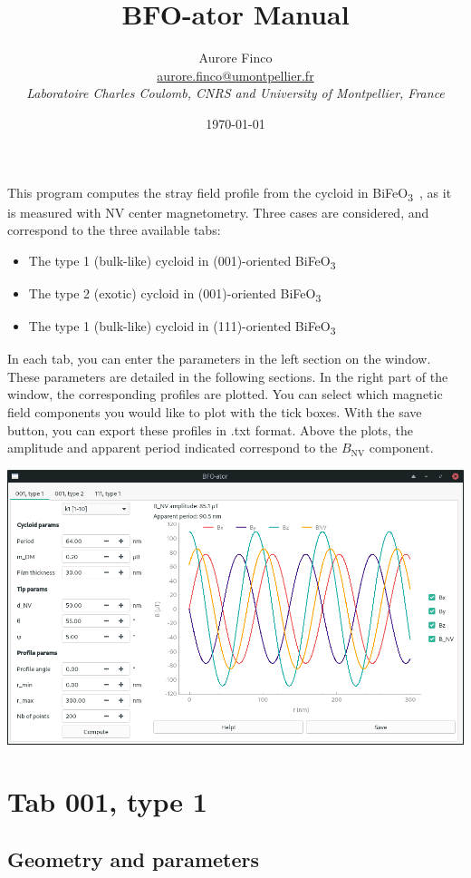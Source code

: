 \documentclass[a4paper,12pt]{article}
\title{BFO-ator Manual}
\author{Aurore Finco\\ \href{mailto:aurore.finco@umontpellier.fr}{aurore.finco@umontpellier.fr}\\ \textit{Laboratoire Charles Coulomb, CNRS and University of Montpellier, France}}
\date{\today}
\newcommand{\BFO}{BiFeO\textsubscript{3}\ }
\begin{document}
\maketitle

This program computes the stray field profile from the cycloid in \BFO, as it is measured with NV center magnetometry. Three cases are considered, and correspond to the three available tabs:
\begin{itemize}
  
\item The type 1 (bulk-like) cycloid in (001)-oriented \BFO
\item The type 2 (exotic) cycloid in (001)-oriented \BFO
\item The type 1 (bulk-like) cycloid in (111)-oriented \BFO
\end{itemize}
In each tab, you can enter the parameters in the left section on the window. These parameters are detailed in the following sections. In the right part of the window, the corresponding profiles are plotted. You can select which magnetic field components you would like to plot with the tick boxes. With the save button, you can export these profiles in .txt format. Above the plots, the amplitude and apparent period indicated correspond to the $B_\text{NV}$ component.
\begin{center}
  \includegraphics[width=15cm]{BFO-ator_window.png}
\end{center}

\clearpage
\section{Tab 001, type 1}
\subsection{Geometry and parameters}
\end{document}
